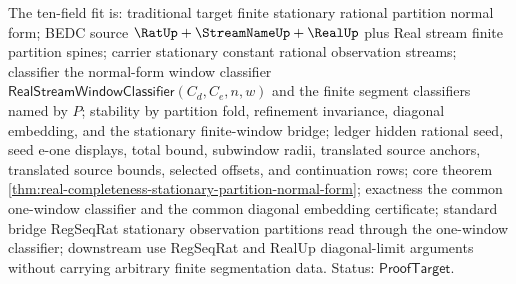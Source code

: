 The ten-field fit is: traditional target finite stationary rational
partition normal form; BEDC source $\RatUp+\StreamNameUp+\RealUp$ plus Real
stream finite partition spines; carrier stationary constant rational
observation streams; classifier the normal-form window classifier
$\mathsf{RealStreamWindowClassifier}(C_d,C_e,n,w)$ and the finite segment
classifiers named by $P$; stability by partition fold, refinement invariance,
diagonal embedding, and the stationary finite-window bridge; ledger hidden
rational seed, seed e-one displays, total bound, subwindow radii, translated
source anchors, translated source bounds, selected offsets, and continuation
rows; core theorem
\autoref{thm:real-completeness-stationary-partition-normal-form}; exactness
the common one-window classifier and the common diagonal embedding
certificate; standard bridge RegSeqRat stationary observation partitions read
through the one-window classifier; downstream use RegSeqRat and RealUp
diagonal-limit arguments without carrying arbitrary finite segmentation data.
Status: $\mathsf{ProofTarget}$.
